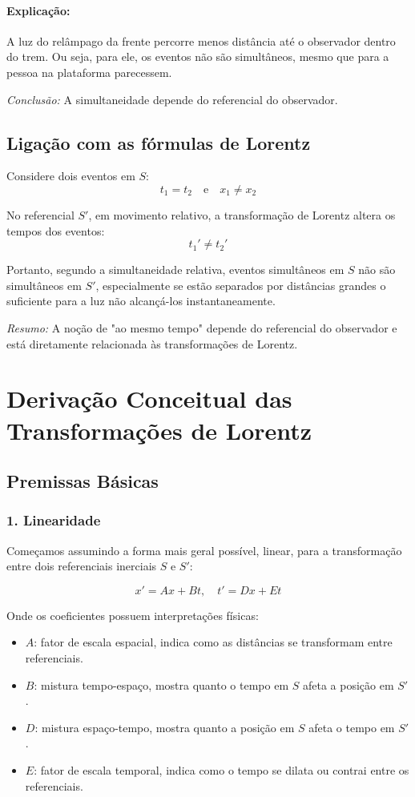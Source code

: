 \documentclass[12pt,a4paper]{article}
\begin{document}
\paragraph{Explicação:}  
A luz do relâmpago da frente percorre menos distância até o observador dentro do trem. Ou seja, para ele, os eventos não são simultâneos, mesmo que para a pessoa na plataforma parecessem.  

\emph{Conclusão:} A simultaneidade depende do referencial do observador.

\subsection{Ligação com as fórmulas de Lorentz}

Considere dois eventos em $S$:
\[
t_1 = t_2 \quad \text{e} \quad x_1 \neq x_2
\]

No referencial $S'$, em movimento relativo, a transformação de Lorentz altera os tempos dos eventos:
\[
t_1' \neq t_2'
\]

Portanto, segundo a simultaneidade relativa, eventos simultâneos em $S$ não são simultâneos em $S'$, especialmente se estão separados por distâncias grandes o suficiente para a luz não alcançá-los instantaneamente.

\emph{Resumo:} A noção de "ao mesmo tempo" depende do referencial do observador e está diretamente relacionada às transformações de Lorentz.

\section{Derivação Conceitual das Transformações de Lorentz}

\subsection{Premissas Básicas}

\subsubsection{1. Linearidade}

Começamos assumindo a forma mais geral possível, linear, para a transformação entre dois referenciais inerciais $S$ e $S'$:

\[
x' = A x + B t, \quad t' = D x + E t
\]

Onde os coeficientes possuem interpretações físicas:

\begin{itemize}
    \item $A$: fator de escala espacial, indica como as distâncias se transformam entre referenciais.
    \item $B$: mistura tempo-espaço, mostra quanto o tempo em $S$ afeta a posição em $S'$.
    \item $D$: mistura espaço-tempo, mostra quanto a posição em $S$ afeta o tempo em $S'$.
    \item $E$: fator de escala temporal, indica como o tempo se dilata ou contrai entre os referenciais.
\end{itemize}
\end{document}
